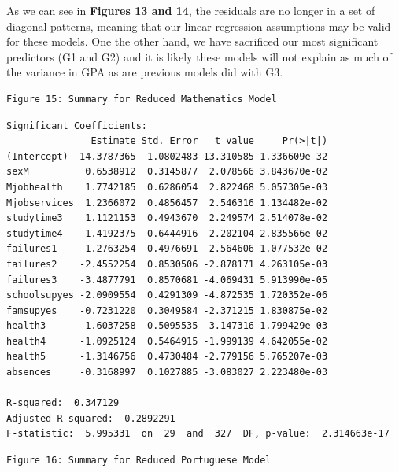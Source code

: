 \documentclass[
  letterpaper,
  DIV=11,
  numbers=noendperiod]{scrartcl}
\begin{document}
As we can see in \textbf{Figures 13 and 14}, the residuals are no longer
in a set of diagonal patterns, meaning that our linear regression
assumptions may be valid for these models. One the other hand, we have
sacrificed our most significant predictors (G1 and G2) and it is likely
these models will not explain as much of the variance in GPA as are
previous models did with G3.

\begin{verbatim}
Figure 15: Summary for Reduced Mathematics Model 
\end{verbatim}

\begin{verbatim}
Significant Coefficients:
               Estimate Std. Error   t value     Pr(>|t|)
(Intercept)  14.3787365  1.0802483 13.310585 1.336609e-32
sexM          0.6538912  0.3145877  2.078566 3.843670e-02
Mjobhealth    1.7742185  0.6286054  2.822468 5.057305e-03
Mjobservices  1.2366072  0.4856457  2.546316 1.134482e-02
studytime3    1.1121153  0.4943670  2.249574 2.514078e-02
studytime4    1.4192375  0.6444916  2.202104 2.835566e-02
failures1    -1.2763254  0.4976691 -2.564606 1.077532e-02
failures2    -2.4552254  0.8530506 -2.878171 4.263105e-03
failures3    -3.4877791  0.8570681 -4.069431 5.913990e-05
schoolsupyes -2.0909554  0.4291309 -4.872535 1.720352e-06
famsupyes    -0.7231220  0.3049584 -2.371215 1.830875e-02
health3      -1.6037258  0.5095535 -3.147316 1.799429e-03
health4      -1.0925124  0.5464915 -1.999139 4.642055e-02
health5      -1.3146756  0.4730484 -2.779156 5.765207e-03
absences     -0.3168997  0.1027885 -3.083027 2.223480e-03

R-squared:  0.347129 
Adjusted R-squared:  0.2892291 
F-statistic:  5.995331  on  29  and  327  DF, p-value:  2.314663e-17 
\end{verbatim}

\begin{verbatim}
Figure 16: Summary for Reduced Portuguese Model 
\end{verbatim}
\end{document}
